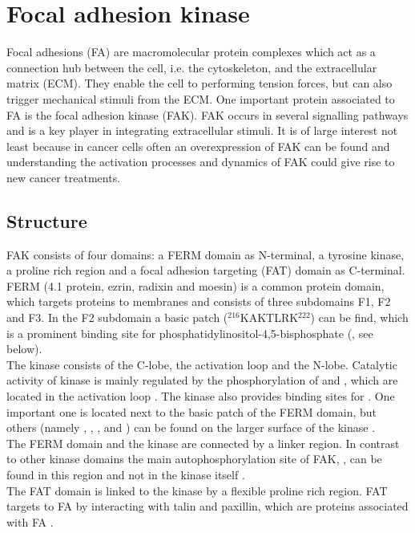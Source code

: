 \section{Focal adhesion kinase}
Focal adhesions (FA) are macromolecular protein complexes which act as a connection hub between the cell, i.e. the cytoskeleton, and the extracellular matrix (ECM). They enable the cell to performing tension forces, but can also trigger mechanical stimuli from the ECM. One important protein associated to FA is the focal adhesion kinase (FAK). FAK occurs in several signalling pathways and is a key player in integrating extracellular stimuli. It is of large interest not least because in cancer cells often an overexpression of FAK can be found and understanding the activation processes and dynamics of FAK could give rise to new cancer treatments.%
\subsection{Structure}
FAK consists of four domains: a FERM domain as N-terminal, a tyrosine kinase, a proline rich region and a focal adhesion targeting (FAT) domain as C-terminal.\\
FERM (4.1 protein, ezrin, radixin and moesin) is a common protein domain, which targets proteins to membranes \autocite{fermdomain} and consists of three subdomains F1, F2 and F3. In the F2 subdomain a basic patch  ($^{216}$KAKTLRK$^{222}$) can be find, which is a prominent binding site for phosphatidylinositol-4,5-bisphosphate (\pip, see below).\\
The kinase consists of the C-lobe, the activation loop and the N-lobe. Catalytic activity of kinase is mainly regulated by the phosphorylation of  and , which are located in the activation loop \autocite{tyrosinePhosphor}. The kinase also provides binding sites for \pip{}. One important one is located next to the basic patch of the FERM domain, but others (namely , , ,  and ) can be found on the larger surface of the kinase \autocites{pap002}{pap002Exp}.\\
The FERM domain and the kinase are connected by a linker region. In contrast to other kinase domains the main autophosphorylation site of FAK, , can be found in this region and not in the kinase itself \autocite{pap001}.\\ %
The FAT domain is linked to the kinase by a flexible proline rich region. FAT targets to FA by interacting with talin and paxillin, which are proteins associated with FA \autocite{fatdomain}.
